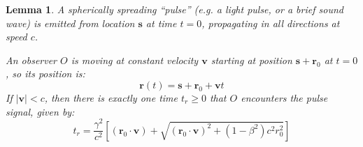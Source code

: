 \documentclass[a4paper]{article}
\theoremstyle{plain}
\newtheorem{lemma}[theorem]{Lemma}
\theoremstyle{definition}
\newcommand{\vect}[1]{\mathbf{#1}}
\begin{document}
\begin{lemma}
\label{lem:IntersectingSpreadingPulse2}
A spherically spreading ``pulse'' (e.g. a light pulse, or a brief
sound wave) is emitted from location $\vect{s}$ at time $t=0$,
propagating in all directions at speed $c$.

An observer $O$ is moving at constant velocity $\vect{v}$ starting at
position $\vect{s} + \vect{r}_0$ at $t=0$, so its position is:
\begin{equation}
\vect{r}(t) = \vect{s} + \vect{r}_0 + \vect{v}t
\end{equation}
If $|\vect{v}| < c$, then there is exactly one time $t_r \geq 0$ that
$O$ encounters the pulse signal, given by:
\begin{equation}
t_r = \frac{\gamma^2}{c^2} \left[ (\vect{r}_0 \cdot \vect{v}) + \sqrt{(\vect{r}_0 \cdot \vect{v})^2 + (1-\beta^2)c^2 r_0^2} \right]
\end{equation}
\end{lemma}
\end{document}
